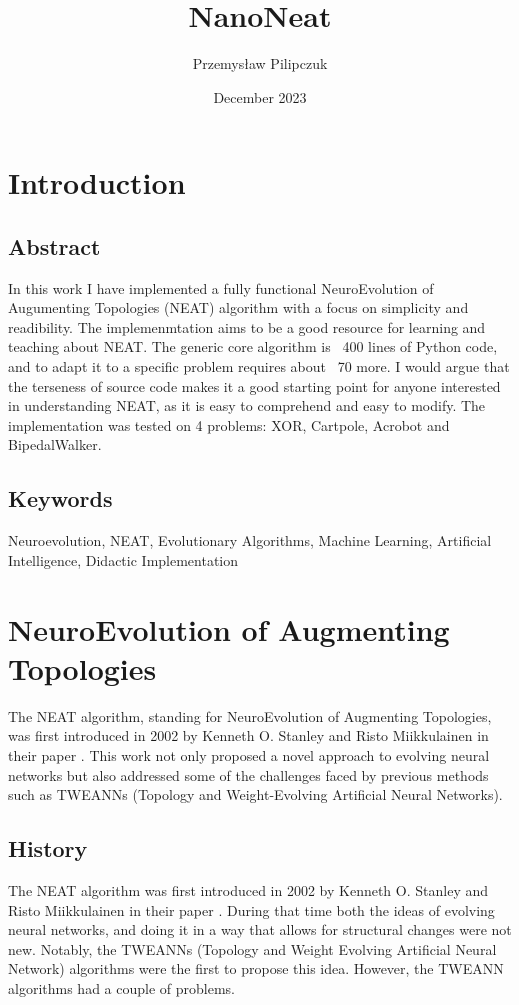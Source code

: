 \documentclass{article}
\title{NanoNeat}
\author{Przemysław Pilipczuk}
\date{December 2023}
\begin{document}
\maketitle

\tableofcontents
\section{Introduction}
\subsection{Abstract}
In this work I have implemented a fully functional  NeuroEvolution of Augumenting Topologies (NEAT) algorithm 
with a focus on simplicity and readibility. The implemenmtation aims to be a good resource for learning and teaching about NEAT.
The generic core algorithm is ~400 lines of Python code, and to adapt it to a specific problem requires about ~70 
more. I would argue that the terseness of source code makes it a good starting point for anyone interested in understanding NEAT, 
as it is easy to comprehend and easy to modify.
The implementation was tested on 4 problems: XOR, Cartpole, Acrobot and BipedalWalker. 

\subsection{Keywords}
Neuroevolution, NEAT, Evolutionary Algorithms, Machine Learning, Artificial Intelligence, Didactic Implementation
\newpage
\section {NeuroEvolution of Augmenting Topologies}
The NEAT algorithm, standing for NeuroEvolution of Augmenting Topologies, was first introduced in 2002 by Kenneth O. Stanley
and Risto Miikkulainen in their paper \cite{originalNeat}. This work not only proposed a novel approach to evolving neural
networks but also addressed some of the challenges faced by previous methods such as TWEANNs (Topology and Weight-Evolving
Artificial Neural Networks).
\subsection{History}
The NEAT algorithm was first introduced in 2002 by Kenneth O. Stanley and Risto Miikkulainen in their paper \cite{originalNeat}. 
During that time both the ideas of evolving neural networks, and doing it in a way that allows for structural changes were not new.
Notably, the TWEANNs (Topology and Weight Evolving Artificial Neural Network) algorithms were the first to propose this idea.
However, the TWEANN algorithms had a couple of problems. 
\end{document}

